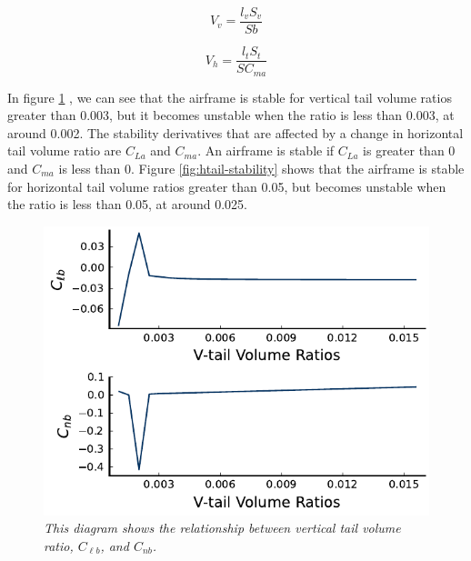 \documentclass{journal}
\begin{document}
	\begin{equation}
		V_v = \frac{l_vS_v}{Sb}
		\label{eqn:vtail-ratio}
	\end{equation}
	
	\begin{equation}
		V_h = \frac{l_tS_t}{SC_{ma}}
		\label{eqn:htail-ratio}
	\end{equation}
	
	In figure \ref{fig:vtail-stability} , we can see that the airframe is stable for vertical tail volume ratios greater than 0.003, but it becomes unstable when the ratio is less than 0.003, at around 0.002. The stability derivatives that are affected by a change in horizontal tail volume ratio are \(C_{La}\) and \(C_{ma}\). An airframe is stable if \(C_{La}\) is greater than 0 and \(C_{ma}\) is less than 0. Figure \ref{fig:htail-stability} shows that the airframe is stable for horizontal tail volume ratios greater than 0.05, but becomes unstable when the ratio is less than 0.05, at around 0.025.\\
	
	\begin{figure}[H]
		\centering
		\includegraphics[scale=0.73]{../graphics/vtail-stability.pdf}
		\caption{\emph{This diagram shows the relationship between vertical tail volume ratio, \(C_{\ell{b}}\), and \(C_{nb}\).}}
		\label{fig:vtail-stability}
	\end{figure}
	
\end{document}
